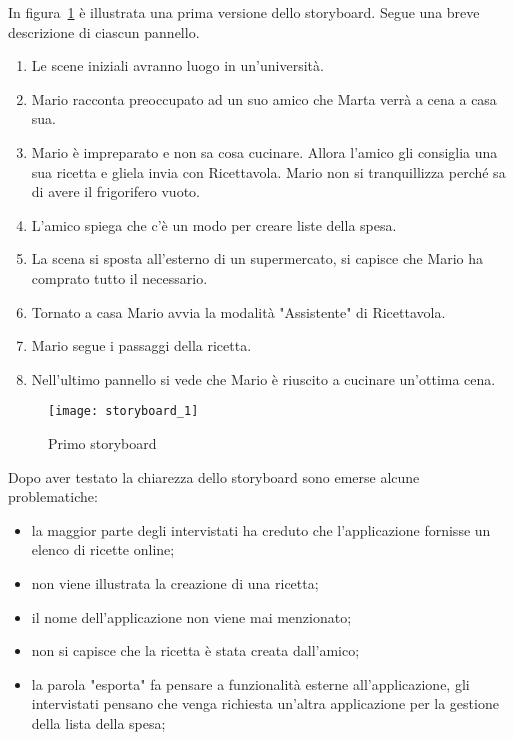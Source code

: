 In figura~\ref{fig:storyboard_1} è illustrata una prima versione dello storyboard.
Segue una breve descrizione di ciascun pannello.
\begin{enumerate}
  \item Le scene iniziali avranno luogo in un'università.
  \item Mario racconta preoccupato ad un suo amico che Marta verrà a cena a casa sua.
  \item Mario è impreparato e non sa cosa cucinare.
    Allora l'amico gli consiglia una sua ricetta e gliela invia con Ricettavola.
    Mario non si tranquillizza perché sa di avere il frigorifero vuoto.
  \item L'amico spiega che c'è un modo per creare liste della spesa.
  \item La scena si sposta all'esterno di un supermercato, si capisce che Mario ha comprato tutto il necessario.
  \item Tornato a casa Mario avvia la modalità "Assistente" di Ricettavola.
  \item Mario segue i passaggi della ricetta.
  \item Nell'ultimo pannello si vede che Mario è riuscito a cucinare un'ottima cena.
\end{enumerate}

\clearpage
\begin{figure}[!ht]
  \begin{center}
    \texttt{[image: storyboard\_1]}
    \caption{Primo storyboard}
    \label{fig:storyboard_1}
  \end{center}
\end{figure}
\clearpage

Dopo aver testato la chiarezza dello storyboard sono emerse alcune problematiche:
\begin{itemize}
  \item la maggior parte degli intervistati ha creduto che l'applicazione fornisse un elenco di ricette online;

  \item non viene illustrata la creazione di una ricetta;

  \item il nome dell'applicazione non viene mai menzionato;

  \item non si capisce che la ricetta è stata creata dall'amico;

  \item la parola "esporta" fa pensare a funzionalità esterne all'applicazione, gli intervistati pensano che venga richiesta un'altra applicazione per la gestione della lista della spesa;
\end{itemize}

